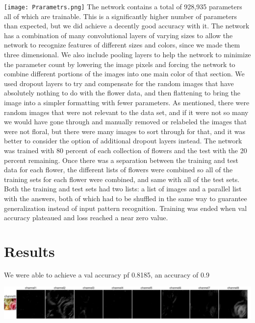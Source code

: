 \documentclass{article}
\begin{document}
\texttt{[image: Prarametrs.png]}
\newline
The network contains a total of 928,935 parameters all of which are trainable. This is a significantly higher number of parameters than expected, but we did achieve a decently good accuracy with it. The network has a combination of many convolutional layers of varying sizes to allow the network to recognize features of different sizes and colors, since we made them three dimensional. We also include pooling layers to help the network to minimize the parameter count by lowering the image pixels and forcing the network to combine different portions of the images into one main color of that section. We used dropout layers to try and compensate for the random images that have absolutely nothing to do with the flower data, and then flattening to bring the image into a simpler formatting with fewer parameters. As mentioned, there were random images that were not relevant to the data set, and if it were not so many we would have gone through and manually removed or relabeled the images that were not floral, but there were many images to sort through for that, and it was better to consider the option of additional dropout layers instead.
\newline
The network was trained with 80 percent of each collection of flowers and the test with the 20 percent remaining. Once there was a separation between the training and test data for each flower, the different lists of flowers were combined so all of the training sets for each flower were combined, and same with all of the test sets. 
Both the training and test sets had two lists: a list of images and a parallel list with the answers, both of which had to be shuffled in the same way to guarantee generalization instead of input pattern recognition. 
Training was ended when val accuracy plateaued and loss reached a near zero value. 


\section{Results}

We were able to achieve a val accuracy pf 0.8185, an accuracy of 0.9

\includegraphics[width=1.2\linewidth]{CHANNELUSE.png}
\end{document}
